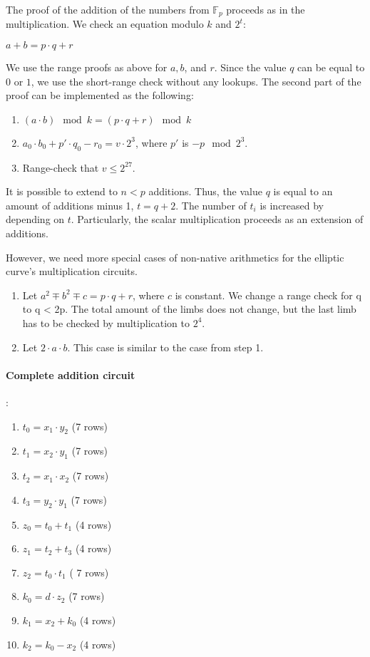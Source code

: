 The proof of the addition of the numbers from $\mathbb{F}_p$ proceeds as in the multiplication.
We check an equation modulo $k$ and $2^t$:
\begin{center}
$a + b = p\cdot q + r$
\end{center}
We use the range proofs as above for $a, b$, and $r$.
Since the value $q$ can be equal to $0$ or $1$, we use the short-range check without any lookups.
The second part of the proof can be implemented as the following:
\begin{enumerate}
\item $(a\cdot b) \mod k = (p \cdot q + r) \mod k$
\item $a_0 \cdot b_0 + p'\cdot q_0 - r_0 = v \cdot 2^3$, where $p'$ is $- p \mod 2^3$.
\item Range-check that $v \leq 2^{27}$.
\end{enumerate} 
It is possible to extend to $n < p$ additions.
Thus, the value $q$ is equal to an amount of additions minus 1, $t = q + 2$.
The number of $t_i $ is increased by depending on $t$.
Particularly, the scalar multiplication proceeds as an extension of additions.

However, we need more special cases of non-native arithmetics for the elliptic curve's multiplication circuits.
\begin{enumerate}
\item Let $a^2 \mp b^2 \mp c = p \cdot q + r$, where $c$ is constant. 
We change a range check for q to q < 2p.
The total amount of the limbs does not change, but the last limb has to be checked by multiplication to $2^4$.
\item Let $2 \cdot a \cdot b$.
This case is similar to the case from step 1.
\end{enumerate}

\paragraph{Complete addition circuit}:
\begin{enumerate}
\item $t_0 = x_1 \cdot y_2$ (7 rows)
\item $t_1 =  x_2 \cdot y_1$ (7 rows)
\item $t_2 =  x_1 \cdot x_2$ (7 rows)
\item $t_3 =  y_2 \cdot y_1$ (7 rows)
\item $z_0 = t_0 + t_1$ (4 rows)
\item $z_1 = t_2 + t_3$ (4 rows)
\item $z_2 = t_0 \cdot t_1$ ( 7 rows)
\item $k_0 = d \cdot z_2$ (7 rows)
\item $k_1 = x_2 +k_0$ (4 rows)
\item $k_2 = k_0 - x_2$ (4 rows)
\end{enumerate}

